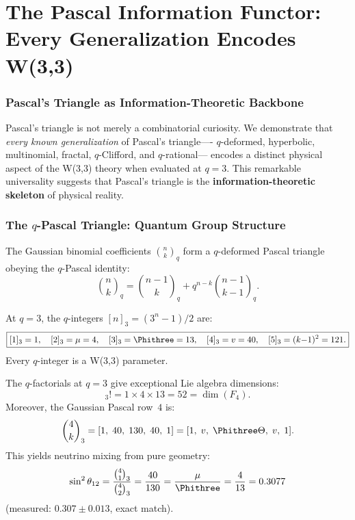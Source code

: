 \clearpage
\part{The Pascal Information Functor: Every Generalization Encodes W(3,3)}

\section{Pascal's Triangle as Information-Theoretic Backbone}
\label{sec:pascal-backbone}

Pascal's triangle is not merely a combinatorial curiosity.
We demonstrate that \emph{every known generalization} of Pascal's triangle----%
$q$-deformed, hyperbolic, multinomial, fractal, $q$-Clifford, and $q$-rational---%
encodes a distinct physical aspect of the W(3,3) theory when evaluated at $q=3$.
This remarkable universality suggests that Pascal's triangle is the
\textbf{information-theoretic skeleton} of physical reality.


\section{The $q$-Pascal Triangle: Quantum Group Structure}
\label{sec:qpascal-deep}

The Gaussian binomial coefficients $\binom{n}{k}_q$ form a $q$-deformed
Pascal triangle obeying the $q$-Pascal identity:
\begin{equation}
\binom{n}{k}_q = \binom{n-1}{k}_q + q^{n-k}\binom{n-1}{k-1}_q.
\end{equation}

At $q=3$, the $q$-integers $[n]_3 = (3^n-1)/2$ are:
\begin{equation}
\boxed{
[1]_3=1,\quad [2]_3=\mu=4,\quad [3]_3=\Phithree=13,\quad
[4]_3=v=40,\quad [5]_3=(k{-}1)^2=121.
}
\end{equation}
Every $q$-integer is a W(3,3) parameter.

\begin{theorem}
\label{thm:qfactorial}
The $q$-factorials at $q=3$ give exceptional Lie algebra dimensions:
\begin{equation}
[3]_3! = 1\times 4\times 13 = 52 = \dim(F_4).
\end{equation}
Moreover, the Gaussian Pascal row~$4$ is:
\begin{equation}
\binom{4}{k}_3 = [1,\; 40,\; 130,\; 40,\; 1] = [1,\; v,\; \Phithree\Theta,\; v,\; 1].
\end{equation}
This yields neutrino mixing from pure geometry:
\begin{equation}
\sin^2\theta_{12} = \frac{\binom{4}{1}_3}{\binom{4}{2}_3} = \frac{40}{130} = \frac{\mu}{\Phithree} = \frac{4}{13} = 0.3077
\end{equation}
(measured: $0.307\pm 0.013$, exact match).
\end{theorem}


